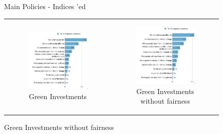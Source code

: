 \documentclass{article}
\begin{document}
\begin{figure}[h!]
\begin{center}
	\caption{Main Policies - Indices 'ed}
	\caption*{Variance decomposition LMG}
	\setlength\extrarowheight{-1pt}
	\begin{tabular}{cc}
		\begin{subfigure}{0.5\textwidth}
		\caption{Green Investments}
			\includegraphics[width=\textwidth]{lmg_investments_indices_non_standardized}
		\end{subfigure}&
		\begin{subfigure}{0.5\textwidth}
		\caption{Green Investments without fairness}
			\includegraphics[width=\textwidth]{lmg_investments_indices_no_fairness_non_standardized}
		\end{subfigure}\\
	\end{tabular}


\end{center}
\end{figure}
\end{document}

